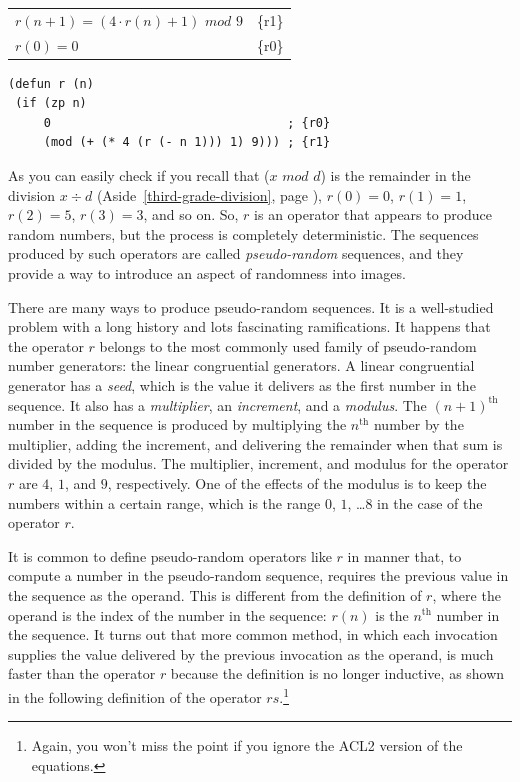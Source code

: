 \begin{center}
\begin{tabular}{ll}
$r(n+1) = (4\cdot r(n) + 1)$ $mod$ $9$ & \{r1\}\\
$r(0) = 0$                        & \{r0\}\\
\end{tabular}
\end{center}

\begin{Verbatim}
(defun r (n)
 (if (zp n)
     0                                 ; {r0}
     (mod (+ (* 4 (r (- n 1))) 1) 9))) ; {r1}
\end{Verbatim}

As you can easily check if you
recall that ($x$ $mod$ $d$) is the remainder in
the division $x \div d$
(Aside~\ref{third-grade-division}, page \pageref{third-grade-division}),
$r(0) = 0$, $r(1) = 1$, $r(2
) = 5$, $r(3) = 3$, 
and so on. 
So, $r$ is an operator that appears to produce random
numbers, but the process is completely deterministic. 
The sequences produced by such operators 
are called \emph{pseudo-random} 
sequences, 
and they provide a way to introduce an aspect of randomness into images.

There are many ways to produce pseudo-random sequences.
It is a well-studied problem with a long history and lots
fascinating ramifications. It happens that the operator 
$r$ belongs to the most commonly used
family of pseudo-random number generators: the
linear congruential generators.
A linear congruential generator has a \emph{seed}, which is
the value it delivers as the first number in the sequence.
It also has a \emph{multiplier}, an \emph{increment}, and a \emph{modulus}.
The $(n+1)^\text{th}$ number in the sequence 
is produced by multiplying the $n^\text{th}$ number by
the multiplier, adding the increment, and delivering
the remainder when that sum is divided by the modulus.
The multiplier, increment, and modulus for the operator $r$
are $4$, $1$, and $9$, respectively.
One of the effects of the modulus is to keep the numbers
within a certain range, which is the range $0$, $1$, \dots $8$ in
the case of the operator $r$.

It is common to define pseudo-random operators like $r$ in
manner that, to compute a number in the pseudo-random sequence, 
requires the previous value in the sequence as the operand.
This is different from the definition of $r$, where the
operand is the index of the number in the sequence: $r(n)$ is the 
$n^\text{th}$ number in the sequence.
It turns out that more common method,
in which each invocation
supplies the value delivered by the previous invocation as
the operand, is much faster than
the operator $r$
because the definition is no longer inductive,
as shown in the following definition of the operator 
$rs$.\footnote{Again, you won't miss the point
if you ignore the ACL2 version of the equations.}


